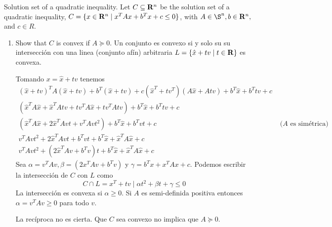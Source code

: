 
\begin{enunciado}{2.10}
Solution set of a quadratic inequality.
Let $C \subseteq \mathbf{R}^n$ be the solution set of a quadratic inequality,
$C = \{x \in \mathbf{R}^n \mid x^TAx + b^Tx + c \leq 0\}$,
with $A \in \S^n, b \in \R^n,$ and $c \in R$.
\end{enunciado}

\newcommand{\hx}{\hat{x}}

\begin{enumerate}[label=(\alph*)]
\item Show that $C$ is convex if $A \succeq 0$.
    Un conjunto es convexo si y solo su su intersección con una linea (conjunto afín)
    arbitraria $L = \{\hx + tv \mid t\in\R\}$ es convexa.

    Tomando $x = \hx + tv$ tenemos
    \begin{align*}
        (\hx + tv)^T A(\hx + tv) + b^T(\hx + tv) + c
        (\hx^T + tv^T)(A\hx + Atv) + b^T\hx + b^Ttv + c \\
        (\hx^TA\hx + \hx^TAtv + tv^TA\hx + tv^TAtv) + b^T\hx + b^Ttv + c \\
        (\hx^TA\hx + 2\hx^TAvt + v^TAvt^2) + b^T\hx + b^Tvt + c &\text{ ($A$ es simétrica)} \\
        v^TAvt^2 + 2\hx^TAvt + b^Tvt + b^T\hx + \hx^TA\hx + c \\
        v^TAvt^2 + (2\hx^TAv + b^Tv)t + b^T\hx + \hx^TA\hx + c
    \end{align*}
    Sea $\alpha = v^TAv, \beta = (2x^TAv + b^Tv)$ y $\gamma = b^Tx + x^TAx + c$.
    Podemos escribir la intersección de $C$ con $L$ como
    \[ C \cap L = {x^T + tv \mid \alpha t^2 + \beta t + \gamma \leq 0}\]
    La intersección es convexa si $\alpha \geq 0$. Si $A$ es semi-definida
    positiva entonces $\alpha = v^TAv \geq 0$ para todo $v$.

    La recíproca no es cierta. Que $C$ sea convexo no implica que $A \succeq 0$.

\end{enumerate}
